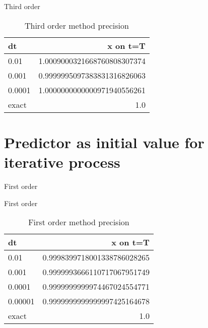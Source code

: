 \documentclass[10pt]{beamer}
\begin{document}
\begin{frame}{Third order}
  \begin{table}
    \caption{Third order method precision}
    \begin{tabular}{lr}
      \toprule
      dt & x on t=T\\
      \midrule
      0.01 & 1.0009000321668760808307374\\
      0.001 & 0.9999995097383831316826063\\
      0.0001 & 1.0000000000000971940556261\\
      \midrule
      exact & 1.0 \\
      \bottomrule
    \end{tabular}
  \end{table}
\end{frame}

\section{Predictor as initial value for iterative process}

\begin{frame}{First order}
  \begin{figure}
  \end{figure}
\end{frame}

\begin{frame}{First order}
  \begin{table}
    \caption{First order method precision}
    \begin{tabular}{lr}
      \toprule
      dt & x on t=T\\
      \midrule
      0.01 & 0.9998399718001338786028265\\
      0.001 & 0.9999993666110717067951749\\
      0.0001 & 0.9999999999974467024554771\\
      0.00001 & 0.9999999999999997425164678\\
      \midrule
      exact & 1.0 \\
      \bottomrule
    \end{tabular}
  \end{table}
\end{frame}
\end{document}
